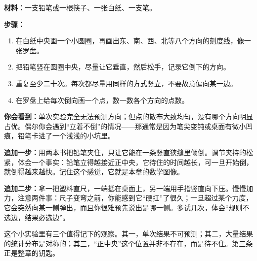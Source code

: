 
\begin{experiment}
\textbf{材料：}一支铅笔或一根筷子、一张白纸、一支笔。

\textbf{步骤：}
\begin{enumerate}[leftmargin=2em]
  \item 在白纸中央画一个小圆圈，再画出东、南、西、北等八个方向的刻度线，像一张罗盘。
  \item 把铅笔竖在圆圈中央，尽量让它垂直，然后松手，记录它倒下的方向。
  \item 重复至少二十次。每次都尽量用同样的方式竖立，不要故意偏向某一边。
  \item 在罗盘上给每次倒向画一个点，数一数各个方向的点数。
\end{enumerate}

\textbf{你会看到：}单次实验完全无法预测方向；但点的散布大致均匀，没有哪个方向明显占优。偶尔你会遇到“立着不倒”的情况——那通常是因为笔尖变钝或桌面有微小凹痕，铅笔卡进了一个浅浅的小坑里。

\textbf{追加一步：}用两本书把铅笔夹住，只让它能在一条竖直狭缝里倾倒。调节夹持的松紧，体会一个事实：铅笔立得越接近正中央，它待住的时间越长，可一旦开始倒，就倒得越来越快。记住这个感觉，它就是本章的数学图像。

\textbf{追加二步：}拿一把塑料直尺，一端抵在桌面上，另一端用手指竖直向下压。慢慢加力，注意两件事：尺子变弯之前，你能感到它“硬扛”了很久；一旦超过某个力度，它会突然向某一侧弹出，而且你很难预先说出是哪一侧。多试几次，体会“规则不选边，结果必选边”。
\end{experiment}

\begin{mainline}
这个小实验里有三个值得记下的观察。其一，单次结果不可预测；其二，大量结果的统计分布是对称的；其三，“正中央”这个位置并非不存在，而是待不住。第三条正是整章的钥匙。
\end{mainline}


